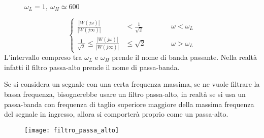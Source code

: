 \begin{figure}[h]
\centering
{}
\caption{$\omega_L = 1,\ \omega_H \simeq \SI{600}{}$}
\end{figure}

$$
\left\{
\begin{aligned}
 \frac{|W(j\omega)|}{|W(j\infty)|} & < \frac{1}{\sqrt{2}} & & \qquad \omega <
\omega_L \\
 \frac{1}{\sqrt{2}} \leq  \frac{|W(j\omega)|}{|W(j\infty)|} & \leq
\sqrt{2} & &\qquad \omega>\omega_L
\end{aligned}
\right.
$$
L'intervallo compreso tra $\omega_L$ e $\omega_H$ prende il nome di banda
passante.
Nella realtà infatti il filtro passa-alto prende il nome di passa-banda.

Se si considera un segnale con una certa frequenza massima, se ne vuole
filtrare la bassa frequenza, bisognerebbe usare un filtro passa-alto, in realtà
se si usa un passa-banda con frequenza di taglio superiore maggiore della
massima frequenza del segnale in ingresso, allora si comporterà proprio come un
passa-alto.
\begin{figure}[h]
 \centering
 \texttt{[image: filtro\_passa\_alto]}
\end{figure}
